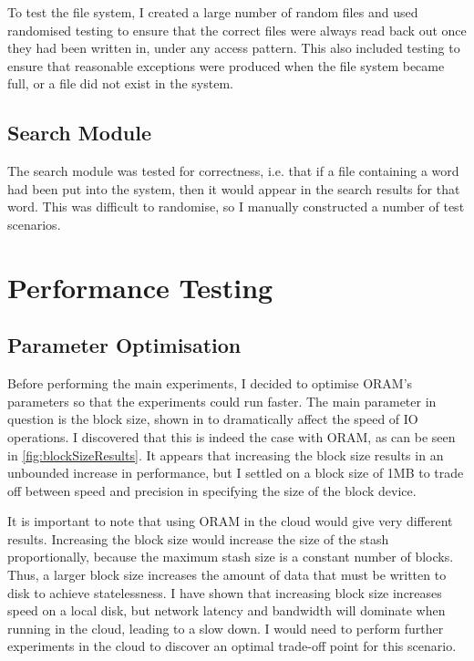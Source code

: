 \documentclass[12pt,a4paper,twoside,openright]{report}
\begin{document}
To test the file system, I created a large number of random files and used randomised testing to ensure that the correct files were always read back out once they had been written in, under any access pattern. This also included testing to ensure that reasonable exceptions were produced when the file system became full, or a file did not exist in the system.

\subsection{Search Module}

The search module was tested for correctness, i.e. that if a file containing a word had been put into the system, then it would appear in the search results for that word. This was difficult to randomise, so I manually constructed a number of test scenarios.

\section{Performance Testing}
\label{sec:performanceTesting}

\subsection{Parameter Optimisation}
\label{sub:parameterOptimisation}

Before performing the main experiments, I decided to optimise ORAM's parameters so that the experiments could run faster. The main parameter in question is the block size, shown in \citet{ousterhout1985trace} to dramatically affect the speed of IO operations. I discovered that this is indeed the case with ORAM, as can be seen in \cref{fig:blockSizeResults}. It appears that increasing the block size results in an unbounded increase in performance, but I settled on a block size of 1MB to trade off between speed and precision in specifying the size of the block device.

It is important to note that using ORAM in the cloud would give very different results. Increasing the block size would increase the size of the stash proportionally, because the maximum stash size is a constant number of blocks. Thus, a larger block size increases the amount of data that must be written to disk to achieve statelessness. I have shown that increasing block size increases speed on a local disk, but network latency and bandwidth will dominate when running in the cloud, leading to a slow down. I would need to perform further experiments in the cloud to discover an optimal trade-off point for this scenario.
\end{document}
